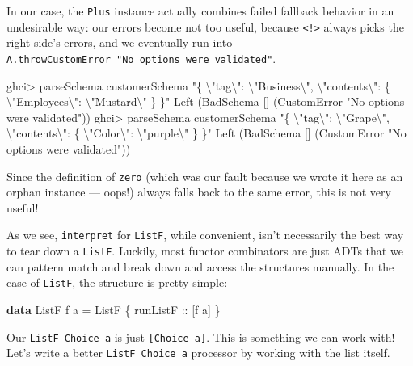 \documentclass[]{article}
\newenvironment{Shaded}{}{}
\newcommand{\DataTypeTok}[1]{\textcolor[rgb]{0.56,0.13,0.00}{#1}}
\newcommand{\KeywordTok}[1]{\textcolor[rgb]{0.00,0.44,0.13}{\textbf{#1}}}
\newcommand{\NormalTok}[1]{#1}
\newcommand{\OperatorTok}[1]{\textcolor[rgb]{0.40,0.40,0.40}{#1}}
\newcommand{\OtherTok}[1]{\textcolor[rgb]{0.00,0.44,0.13}{#1}}
\newcommand{\StringTok}[1]{\textcolor[rgb]{0.25,0.44,0.63}{#1}}
\begin{document}
In our case, the \texttt{Plus} instance actually combines failed fallback
behavior in an undesirable way: our errors become not too useful, because
\texttt{\textless{}!\textgreater{}} always picks the right side's errors, and we
eventually run into \texttt{A.throwCustomError\ "No\ options\ were\ validated"}.

\begin{Shaded}
\begin{Highlighting}[]
\NormalTok{ghci}\OperatorTok{>}\NormalTok{ parseSchema customerSchema  }\StringTok{"\{ \textbackslash{}"tag\textbackslash{}": \textbackslash{}"Business\textbackslash{}", \textbackslash{}"contents\textbackslash{}": \{ \textbackslash{}"Employees\textbackslash{}": \textbackslash{}"Mustard\textbackslash{}" \} \}"}
\DataTypeTok{Left}\NormalTok{ (}\DataTypeTok{BadSchema}\NormalTok{ [] (}\DataTypeTok{CustomError} \StringTok{"No options were validated"}\NormalTok{))}
\NormalTok{ghci}\OperatorTok{>}\NormalTok{ parseSchema customerSchema  }\StringTok{"\{ \textbackslash{}"tag\textbackslash{}": \textbackslash{}"Grape\textbackslash{}", \textbackslash{}"contents\textbackslash{}": \{ \textbackslash{}"Color\textbackslash{}": \textbackslash{}"purple\textbackslash{}" \} \}"}
\DataTypeTok{Left}\NormalTok{ (}\DataTypeTok{BadSchema}\NormalTok{ [] (}\DataTypeTok{CustomError} \StringTok{"No options were validated"}\NormalTok{))}
\end{Highlighting}
\end{Shaded}

Since the definition of \texttt{zero} (which was our fault because we wrote it
here as an orphan instance --- oops!) always falls back to the same error, this
is not very useful!

As we see, \texttt{interpret} for \texttt{ListF}, while convenient, isn't
necessarily the best way to tear down a \texttt{ListF}. Luckily, most functor
combinators are just ADTs that we can pattern match and break down and access
the structures manually. In the case of \texttt{ListF}, the structure is pretty
simple:

\begin{Shaded}
\begin{Highlighting}[]
\KeywordTok{data} \DataTypeTok{ListF}\NormalTok{ f a }\OtherTok{=} \DataTypeTok{ListF}\NormalTok{ \{}\OtherTok{ runListF ::}\NormalTok{ [f a] \}}
\end{Highlighting}
\end{Shaded}

Our \texttt{ListF\ Choice\ a} is just \texttt{{[}Choice\ a{]}}. This is
something we can work with! Let's write a better \texttt{ListF\ Choice\ a}
processor by working with the list itself.
\end{document}
